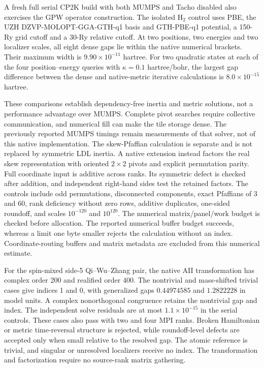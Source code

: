 \documentclass[11pt]{article}
\begin{document}
A fresh full serial CP2K build with both MUMPS and Tacho disabled
also exercises the GPW operator construction. The isolated H$_2$
control uses PBE, the UZH DZVP-MOLOPT-GGA-GTH-q1 basis and GTH-PBE-q1
potential, a 150-Ry grid cutoff and a 30-Ry relative cutoff.
At two positions, two energies and two localizer scales, all eight
dense gaps lie within the native numerical brackets. Their maximum
width is $9.90\times10^{-11}$ hartree.
For two quadratic states at each of the four position--energy
queries with $\kappa=0.1$ hartree/bohr, the largest gap difference
between the dense and native-metric iterative calculations is
$8.0\times10^{-15}$ hartree.

These comparisons establish dependency-free inertia and metric
solutions, not a performance advantage over MUMPS. Complete pivot
searches require collective communication, and numerical fill can
make the tile storage dense. The previously reported MUMPS timings
remain measurements of that solver, not of this native implementation.
The skew-Pfaffian calculation is separate and is not replaced by
symmetric LDL inertia. A native extension instead factors the real
skew representation with oriented $2\times2$ pivots and explicit
permutation parity. Full coordinate input is additive across ranks.
Its symmetric defect is checked after addition, and independent
right-hand sides test the retained factors. The controls include odd
permutations, disconnected components, exact Pfaffians of 3 and 60,
rank deficiency without zero rows, additive duplicates, one-sided
roundoff, and scales $10^{-120}$ and $10^{120}$.
The numerical matrix/panel/work budget is checked before allocation.
The reported numerical buffer budget succeeds, whereas a limit one byte smaller
rejects the calculation without an index. Coordinate-routing buffers
and matrix metadata are excluded from this numerical estimate.

For the spin-mixed side-5 Qi--Wu--Zhang pair, the native AII
transformation has complex order 200 and realified order 400.
The nontrivial and mass-shifted trivial cases give indices 1 and 0,
with generalized gaps $0.44974585$ and $1.2822228$ in model units.
A complex nonorthogonal congruence retains the nontrivial gap and
index. The independent solve residuals are at most
$1.1\times10^{-15}$ in the serial controls. These cases also pass
with two and four MPI ranks. Broken Hamiltonian or metric time-reversal
structure is rejected, while roundoff-level defects are accepted
only when small relative to the resolved gap. The atomic reference
is trivial, and singular or unresolved localizers receive no index.
The transformation and factorization require no source-rank matrix
gathering.
\end{document}
